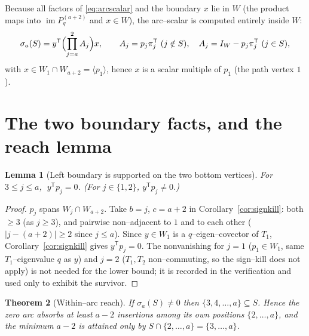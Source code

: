 \documentclass[11pt]{article}
\newtheorem{theorem}{Theorem}
\newtheorem{lemma}[theorem]{Lemma}
\theoremstyle{definition}
\DeclareMathOperator{\im}{im}
\newcommand{\Pq}{P_{q}}
\newcommand{\W}{W}
\begin{document}
Because all factors of \eqref{eq:arcscalar} and the boundary $x$ lie in $\W$ (the product
maps into $\im\Pq^{(a+2)}$ and $x\in\W$), the arc--scalar is computed entirely inside $\W$:
\begin{equation}\label{eq:arcW}
\sigma_a(S)=y^{\mathsf T}\Bigl(\prod_{j=a}^{2}A_j\Bigr)x,\qquad
A_j=p_j\pi_j^{\mathsf T}\ (j\notin S),\quad A_j=I_\W-p_j\pi_j^{\mathsf T}\ (j\in S),
\end{equation}
with $x\in\W_1\cap\W_{a+2}=\langle p_1\rangle$, hence $x$ is a scalar multiple of $p_1$
(the path vertex $1$).

\section{The two boundary facts, and the reach lemma}

\begin{lemma}[Left boundary is supported on the two bottom vertices]\label{lem:leftbdry}
For $3\le j\le a$, $\;y^{\mathsf T}p_j=0$. \textup(For $j\in\{1,2\}$, $y^{\mathsf T}p_j\ne0$.\textup)
\end{lemma}

\begin{proof}
$p_j$ spans $\W_j\cap\W_{a+2}$. Take $b=j$, $c=a+2$ in Corollary~\ref{cor:signkill}: both
$\ge3$ (as $j\ge3$), and pairwise non--adjacent to $1$ and to each other
($|j-(a+2)|\ge2$ since $j\le a$). Since $y\in\W_1$ is a $q$--eigen--covector of $T_1$,
Corollary~\ref{cor:signkill} gives $y^{\mathsf T}p_j=0$. The nonvanishing for $j=1$
($p_1\in\W_1$, same $T_1$--eigenvalue $q$ as $y$) and $j=2$ ($T_1,T_2$ non--commuting, so
the sign--kill does not apply) is not needed for the lower bound; it is recorded in the
verification and used only to exhibit the survivor.
\end{proof}

\begin{theorem}[Within--arc reach]\label{thm:reach}
If $\sigma_a(S)\ne0$ then $\{3,4,\dots,a\}\subseteq S$. Hence the zero arc absorbs at least
$a-2$ insertions among its own positions $\{2,\dots,a\}$, and the minimum $a-2$ is attained
\emph{only} by $S\cap\{2,\dots,a\}=\{3,\dots,a\}$.
\end{theorem}
\end{document}
